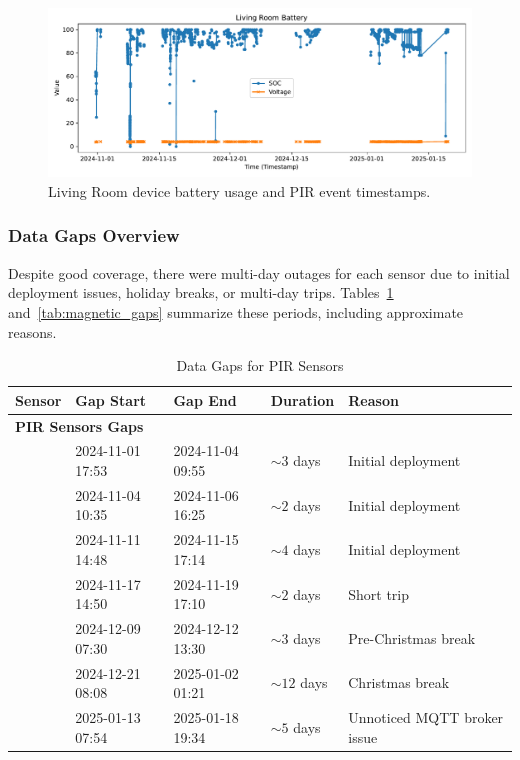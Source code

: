 \documentclass[A4,10pt]{article}
\begin{document}
\begin{itemize}
    \begin{figure}[H]
        \centering
        \includegraphics[width=1.15\textwidth]{livingroom_battery.pdf}
        \caption{Living Room device battery usage and PIR event timestamps.}
        \label{fig:livingroom_battery}
    \end{figure}

	\subsubsection{Data Gaps Overview}
	\label{sec:data_gaps}
	
	Despite good coverage, there were multi-day outages for each sensor due to initial deployment issues, holiday breaks, or multi-day trips. Tables~\ref{tab:pir_gaps} and~\ref{tab:magnetic_gaps} summarize these periods, including approximate reasons.
	
	\begin{table}[ht!]
	\centering
	\caption{Data Gaps for PIR Sensors}
	\label{tab:pir_gaps}
	\begin{tabular}{lllll}
	\hline
	\textbf{Sensor}            & \textbf{Gap Start}      & \textbf{Gap End}       & \textbf{Duration} & \textbf{Reason}              \\
	\hline
	\multicolumn{5}{l}{\textbf{PIR Sensors Gaps}} \\
							   & 2024-11-01 17:53        & 2024-11-04 09:55       & $\sim3$ days      & Initial deployment           \\
							   & 2024-11-04 10:35        & 2024-11-06 16:25       & $\sim2$ days      & Initial deployment           \\
							   & 2024-11-11 14:48        & 2024-11-15 17:14       & $\sim4$ days      & Initial deployment           \\
							   & 2024-11-17 14:50        & 2024-11-19 17:10       & $\sim2$ days      & Short trip                   \\
							   & 2024-12-09 07:30        & 2024-12-12 13:30       & $\sim3$ days      & Pre-Christmas break          \\
							   & 2024-12-21 08:08        & 2025-01-02 01:21       & $\sim12$ days     & Christmas break              \\
							   & 2025-01-13 07:54        & 2025-01-18 19:34       & $\sim5$ days      & Unnoticed MQTT broker issue               \\
	\end{tabular}
	\end{table}
	

\end{itemize}
\end{document}
